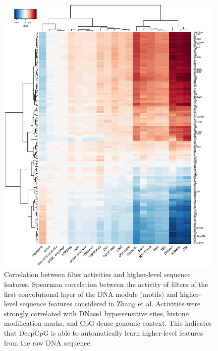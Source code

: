 \begin{figure}[htbp!]
\centering
\includegraphics[width=1.0\textwidth]{motifs_feat}
\caption[Correlation between filter activities and higher-level sequence features.]{Correlation between filter activities and higher-level sequence features. Spearman correlation between the activity of filters of the first convolutional layer of the DNA module (motifs) and higher-level sequence features considered in Zhang et al. Activities were strongly correlated with DNase1 hypersensitive sites, histone modification marks, and CpG dense genomic context. This indicates that DeepCpG is able to automatically learn higher-level features from the raw DNA sequence.}
\label{fig:dcpg_eval_motifs_feat}
\end{figure}

